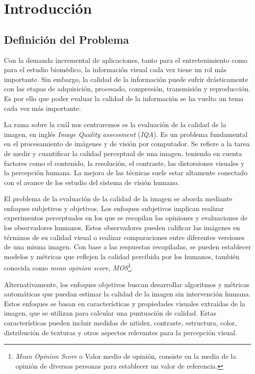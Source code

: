 \chapter{Introducción}
\section{Definición del Problema}   
Con la demanda incremental de aplicaciones, tanto para el entretenimiento 
como para el estudio biomédico, la información visual cada vez tiene un rol 
más importante. Sin embargo, la calidad de la información puede sufrir drásticamente
con las etapas de adquisición, procesado, compresión, transmisión y reproducción.
Es por ello que poder evaluar la calidad de la información se ha vuelto un 
tema cada vez más importante\cite{VisualMedicalQualityBook}.

La rama sobre la cuál nos centraremos es la evaluación de la calidad de la imagen,
en inglés \emph{Image Quality assessment} (\emph{IQA}).
Es un problema fundamental en el procesamiento de imágenes y de visión 
por computador. Se refiere a la tarea de medir y cuantificar 
la calidad perceptual de una imagen, 
teniendo en cuenta factores como el contenido, la resolución, 
el contraste, las distorsiones visuales y la percepción humana. 
La mejora de las técnicas suele estar altamente conectado con el avance 
de los estudio del sistema de visión humano\cite{Wang2006ModernIQ}.
 
El problema de la evaluación de la calidad de la imagen se aborda mediante enfoques 
subjetivos y objetivos. Los enfoques subjetivos implican realizar experimentos 
perceptuales en los que se recopilan las opiniones y evaluaciones de los observadores 
humanos. Estos observadores pueden calificar las imágenes en términos de su 
calidad visual o realizar comparaciones entre diferentes versiones de una misma imagen. 
Con base a las respuestas recopiladas, se pueden establecer modelos y 
métricas que reflejen la calidad percibida por los humanos, también conocida
como \emph{mean opinion score, MOS}\footnote{
\emph{Mean Opinion Score} o Valor medio de opinión, consiste en 
la media de la opinión de diversas personas para establecer un valor de referencia. 
}.

Alternativamente, los enfoques objetivos buscan desarrollar algoritmos y métricas 
automáticas que puedan estimar la calidad de la imagen sin intervención humana. 
Estos enfoques se basan en características y propiedades visuales extraídas de la 
imagen, que se utilizan para calcular una puntuación de calidad. Estas características 
pueden incluir medidas de nitidez, contraste, estructura, color, distribución de 
texturas y otros aspectos relevantes para la percepción visual.
 
